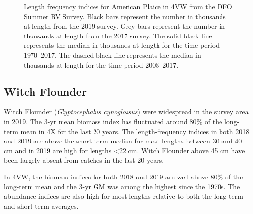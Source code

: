 \documentclass[11pt]{book}
\begin{document}
\begin{figure}[htb]

{\centering {} 

}

\caption{Length frequency indices for American Plaice in 4VW from the DFO Summer RV Survey. Black bars represent the number in thousands at length from the 2019 survey. Grey bars represent the number in thousands at length from the 2017 survey. The solid black line represents the median in thousands at length for the time period 1970--2017. The dashed black line represents the median in thousands at length for the time period 2008--2017.}\label{fig:54-fig-aplaice-lengthfreq4VW}
\end{figure}
\clearpage

\hypertarget{witch-flounder}{%
\subsection{Witch Flounder}\label{witch-flounder}}

Witch Flounder (\emph{Glyptocephalus cynoglossus}) were widespread in the survey area in 2019. The 3-yr mean biomass index has fluctuated around 80\% of the long-term mean in 4X for the last 20 years. The length-frequency indices in both 2018 and 2019 are above the short-term median for most lengths between 30 and 40 cm and in 2019 are high for lengths \textless22 cm. Witch Flounder above 45 cm have been largely absent from catches in the last 20 years.

In 4VW, the biomass indices for both 2018 and 2019 are well above 80\% of the long-term mean and the 3-yr GM was among the highest since the 1970s. The abundance indices are also high for most lengths relative to both the long-term and short-term averages.
\end{document}
